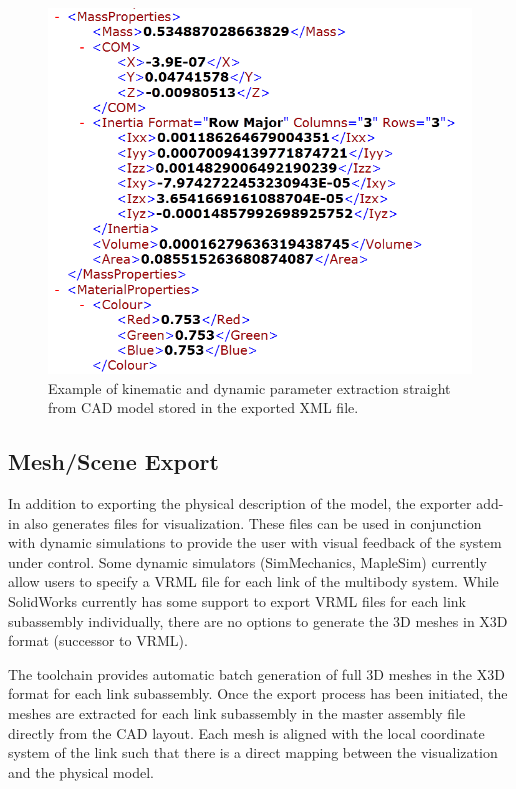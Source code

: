 \begin{figure}[!h]
	\centering
    \includegraphics[scale=0.6]{fig/toolchain/exportfile.png}
  	\caption{Example of kinematic and dynamic parameter extraction straight from CAD model stored in the exported XML file.}
	\label{fig:exportfile}
\end{figure}


\subsection{Mesh/Scene Export} %
\label{sub:mesh_scene_export}
In addition to exporting the physical description of the model, the exporter add-in also generates files for visualization. These files can be used in conjunction with dynamic simulations to provide the user with visual feedback of the system under control. Some dynamic simulators (SimMechanics, MapleSim) currently allow users to specify a VRML file for each link of the multibody system. While SolidWorks currently has some support to export VRML files for each link subassembly individually, there are no options to generate the 3D meshes in X3D format (successor to VRML).

The toolchain provides automatic batch generation of full 3D meshes in the X3D format for each link subassembly. Once the export process has been initiated, the meshes are extracted for each link subassembly in the master assembly file directly from the CAD layout. Each mesh is aligned with the local coordinate system of the link such that there is a direct mapping between the visualization and the physical model.

